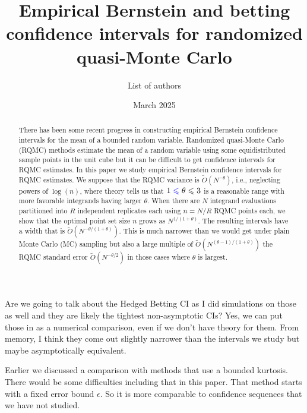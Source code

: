 \documentclass{article}
\title{Empirical Bernstein and betting confidence intervals for randomized quasi-Monte Carlo}
\date{March 2025}
\author{List of authors}
\newcommand{\art}[1]{\begingroup\color{blue}#1\endgroup}
\newcommand{\aadit}[1]{\begingroup\color{orange}#1\endgroup}
\newcommand{\fred}[1]{\begingroup\color{red}#1\endgroup}
\renewcommand{\le}{\leqslant}
\begin{document}
\maketitle
\begin{abstract}
There has been some recent progress in constructing empirical Bernstein
confidence intervals for the mean of a bounded random variable.
Randomized quasi-Monte Carlo (RQMC) methods estimate the mean of a random
variable using some equidistributed sample points in the unit cube
but it can be difficult to get confidence intervals for RQMC
estimates.  In this paper we study empirical Bernstein confidence
intervals for RQMC estimates.  We suppose that
the RQMC variance is $\tilde O(N^{-\theta})$\fred{, i.e., neglecting powers of $\log (n)$,} where
theory tells us that $1\art{\le}\theta\le3$ 
is a reasonable
range with more favorable integrands having larger
$\theta$. When there are $N$ integrand evaluations
partitioned into $R$ independent replicates each using $n=N/R$
RQMC points each, we show that the optimal point set size $n$ grows
as $N^{1/(1+\theta)}$. The resulting intervals have
a width that is $\tilde O(N^{-\theta/(1+\theta)})$. 
This is  much narrower
than we would get under plain Monte Carlo (MC) sampling
but also a large multiple of \fred{$\tilde O(N^{(\theta - 1)/(1+\theta)})$ }the RQMC standard error $\tilde O(N^{-\theta/2})$ in those cases where $\theta$ is largest.
\end{abstract}

\aadit{Are we going to talk about the Hedged Betting CI as I did simulations on those as well and they are likely the tightest non-asymptotic CIs?}
\art{Yes, we can put those in as a numerical comparison, even if we don't have theory for them.  From memory, I think they come out slightly narrower
than the intervals we study but maybe asymptotically equivalent.}

\art{Earlier we discussed a comparison with methods that use a
bounded kurtosis. There would be some difficulties including that
in this paper.  That method starts with a fixed error bound $\epsilon$. So
it is more comparable to confidence sequences that we have not
studied.}
\end{document}
